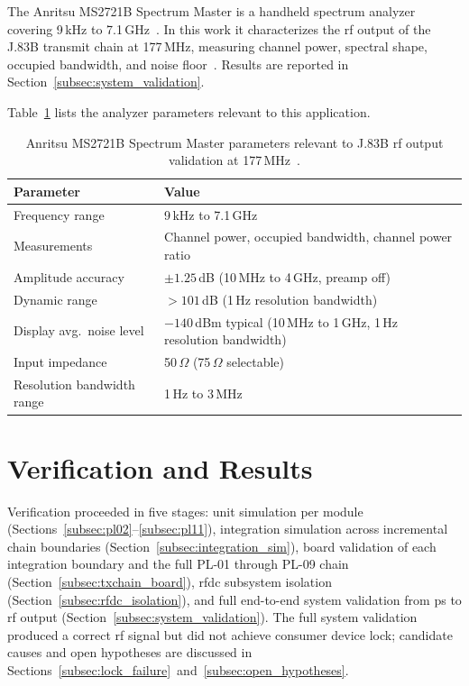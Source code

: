 The Anritsu MS2721B Spectrum Master is a handheld spectrum analyzer
covering 9\,kHz to 7.1\,GHz~\cite{Anritsu_MS2721B}.
In this work it characterizes the \ac{rf} output of the J.83B transmit
chain at 177\,MHz, measuring channel power, spectral shape, occupied
bandwidth, and noise floor~\cite{Anritsu_MS2721B}.
Results are reported in Section~\ref{subsec:system_validation}.

Table~\ref{tab:ms2721b_spec} lists the analyzer parameters relevant
to this application.

\begin{table}[htbp]
  \caption{Anritsu MS2721B Spectrum Master parameters relevant to
           J.83B \ac{rf} output validation at
           177\,MHz~\cite{Anritsu_MS2721B}.}
  \label{tab:ms2721b_spec}
  \centering
  \small
  \begin{tabular}{ll}
    \hline
    Parameter                       & Value \\
    \hline
    Frequency range                 & 9\,kHz to 7.1\,GHz \\[2pt]
    Measurements                    & Channel power, occupied bandwidth,
                                      channel power ratio \\[2pt]
    Amplitude accuracy              & $\pm 1.25$\,dB
                                      (10\,MHz to 4\,GHz, preamp off) \\[2pt]
    Dynamic range                   & $> 101$\,dB (1\,Hz resolution bandwidth) \\[2pt]
    Display avg.\ noise level       & $-140$\,dBm typical
                                      (10\,MHz to 1\,GHz, 1\,Hz resolution bandwidth) \\[2pt]
    Input impedance                 & 50\,$\Omega$ (75\,$\Omega$ selectable) \\[2pt]
    Resolution bandwidth range      & 1\,Hz to 3\,MHz \\
    \hline
  \end{tabular}
\end{table}

\clearpage

\section{Verification and Results}
\label{sec:verification}

Verification proceeded in five stages: unit simulation per module
(Sections~\ref{subsec:pl02}--\ref{subsec:pl11}), integration
simulation across incremental chain boundaries
(Section~\ref{subsec:integration_sim}), board validation of each
integration boundary and the full PL-01 through PL-09 chain
(Section~\ref{subsec:txchain_board}), \ac{rfdc} subsystem isolation
(Section~\ref{subsec:rfdc_isolation}), and full end-to-end system
validation from \ac{ps} to \ac{rf} output
(Section~\ref{subsec:system_validation}).
The full system validation produced a correct \ac{rf} signal but did
not achieve consumer device lock; candidate causes and open
hypotheses are discussed in
Sections~\ref{subsec:lock_failure}~and~\ref{subsec:open_hypotheses}.

